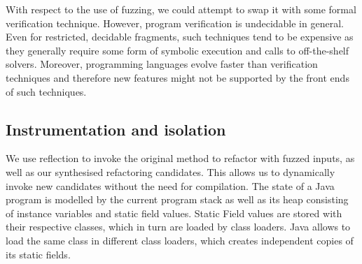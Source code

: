 \documentclass[sigconf,review,anonymous]{acmart}
\begin{document}

With respect to the use of fuzzing,
we could attempt to swap it with some formal verification technique.
However, program verification is undecidable in general.
Even for restricted, decidable fragments, such
techniques tend to be expensive as they generally require some form of
symbolic execution and calls to off-the-shelf solvers.  Moreover,
programming languages evolve faster than verification techniques and
therefore new features might not be supported by the front ends of
such techniques.






\subsection{Instrumentation and isolation}

We use reflection to invoke the original method to refactor with fuzzed inputs,
as well as our synthesised refactoring candidates. This allows us to dynamically
invoke new candidates without the need for compilation. The state of a Java
program is modelled by the current program stack as well as its heap consisting
of instance variables and static field values. Static Field values are stored
with their respective classes, which in turn are loaded by class loaders. Java
allows to load the same class in different class loaders, which creates
independent copies of its static fields.
\end{document}
